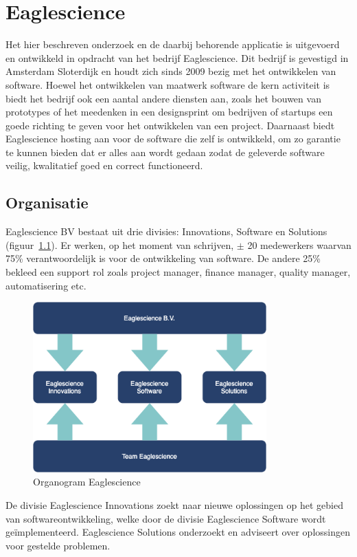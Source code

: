 \chapter{Eaglescience}\label{ch:Eaglescience} %

Het hier beschreven onderzoek en de daarbij behorende applicatie is uitgevoerd en ontwikkeld in opdracht van het bedrijf Eaglescience. Dit bedrijf is gevestigd in Amsterdam Sloterdijk en houdt zich sinds 2009 bezig met het ontwikkelen van software. Hoewel het ontwikkelen van maatwerk software de kern activiteit is biedt het bedrijf ook een aantal andere diensten aan, zoals het bouwen van prototypes of het meedenken in een designsprint om bedrijven of startups een goede richting te geven voor het ontwikkelen van een project. Daarnaast biedt Eaglescience hosting aan voor de software die zelf is ontwikkeld, om zo garantie te kunnen bieden dat er alles aan wordt gedaan zodat de geleverde software veilig, kwalitatief goed en correct functioneerd.

\section{Organisatie}\label{sec:organisatie}
Eaglescience BV bestaat uit drie divisies: Innovations, Software en Solutions (figuur~\ref{fig:Eaglescience organogram}). Er werken, op het moment van schrijven, $\pm$ 20 medewerkers waarvan 75\% verantwoordelijk is voor de ontwikkeling van software. De andere 25\% bekleed een support rol zoals project manager, finance manager, quality manager, automatisering etc.

\begin{figure}[bth]
\myfloatalign
\includegraphics[width=9cm]{gfx/organogram}
\caption{Organogram Eaglescience}
\label{fig:Eaglescience organogram}
\end{figure}
De divisie Eaglescience Innovations zoekt naar nieuwe oplossingen op het gebied van softwareontwikkeling, welke door de divisie Eaglescience Software wordt geïmplementeerd. Eaglescience Solutions onderzoekt en adviseert over oplossingen voor gestelde problemen.

